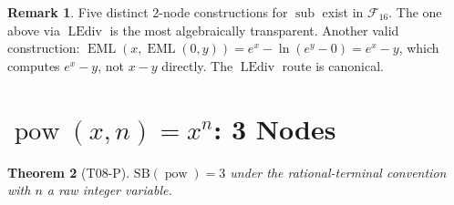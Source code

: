 \documentclass[12pt,a4paper]{article}
\newtheorem{theorem}{Theorem}[section]
\theoremstyle{definition}
\newtheorem{remark}[theorem]{Remark}
\newcommand{\EML}{\operatorname{EML}}
\newcommand{\LEdiv}{\operatorname{LEdiv}}
\newcommand{\subop}{\operatorname{sub}}
\newcommand{\powop}{\operatorname{pow}}
\newcommand{\SB}{\mathrm{SB}}
\newcommand{\F}{\mathcal{F}_{16}}
\begin{document}
\begin{remark}
Five distinct 2-node constructions for $\subop$ exist in $\F$.  The one above
via $\LEdiv$ is the most algebraically transparent.  Another valid construction:
$\EML(x, \EML(0,y)) = e^x - \ln(e^y - 0) = e^x - y$,
which computes $e^x - y$, not $x-y$ directly.  The $\LEdiv$ route is canonical.
\end{remark}

\section{\texorpdfstring{$\powop(x,n) = x^n$}{pow(x,n)}: 3 Nodes}
\label{sec:pow}

\begin{theorem}[T08-P]
\label{thm:pow}
$\SB(\powop) = 3$ under the rational-terminal convention with $n$ a raw integer variable.
\end{theorem}
\end{document}

